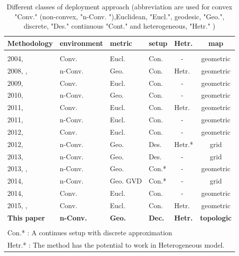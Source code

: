 \documentclass[twocolumn]{svjour3}       %
\begin{document}
\begin{table}[t]
\centering
\caption{Different classes of deployment approach (abbreviation are used for convex "Conv." (non-convex, "n-Conv. "),Euclidean, "Eucl.", geodesic, "Geo.", discrete, "Des." continuous "Cont." and heterogeneous, "Hetr." )   }
\label{tbl:classification}
\begin{tabular}{m{1.8cm}m{1.2cm}m{0.8cm}m{0.55cm}m{0.55cm}c}
Methodology                  	      & environment   & metric     & setup 	& Hetr. & map    \\
 \hline
 \\
 2004, \cite{Cortes2004}      		 & Conv.     	      &  Eucl. & Con.  		&	 ~~- & geometric	\\
 2008, \cite{Pimenta2008},\cite{Pimenta2088SCAT}&n-Conv.&  Geo.  & Con.  		& Hetr.& geometric \\
 2009, \cite{Schwager2009}    		 & Conv.    		  &  Eucl. & Con.		&  ~~- & geometric   \\
 2010, \cite{Breitenmoser2010} 		 & n-Conv.	      &  Geo.  & Con.   	&  ~~- & geometric	\\
 2011, \cite{Stergi2011}    	     & Conv.  	 		  &  Eucl. & Con. 	 	& Hetr.& geometric \\
 2011, \cite{Schwager2011}	   		 & n-Conv. 		  &  Eucl. & Con. 	 	& ~~-    & geometric \\
 2012, \cite{Mahboubi2012}     		 & Conv. 		  &  Eucl. & Con. 		&  ~~-   & geometric \\
 2012, \cite{Durham2012}	  		 & n-Conv. 	      &  Geo.  & Des. 		& Hetr.*& grid\\
 2013, \cite{Yun2013}        		 & n-Conv.		  &  Geo.  & Des. 		&   ~~-  	& grid \\
 2013, \cite{Bhattacharya2013IJRR},\cite{Bhattacharya2013a}		 & n-Conv. 	      &  Geo.  & Con.*    	&  ~~- 	& geometric\\
 2014, \cite{reza2014} 		  		 & n-Conv. 		  & Geo. GVD& Con.*      &  ~~- 	& grid\\
 2014, \cite{Sharifi2014}  	  		 & Conv. 	  	     & Eucl.   & Con.       &  ~~- 	& geometric\\
 2015, \cite{Sharifi2015},\cite{Pierson2015}  	  		 & Conv. 	  	     & Eucl.   & Con.       &  Hetr. & geometric\\
\textbf{This paper}				  		 &\textbf{n-Conv.}	     &\textbf{Geo.}& \textbf{Dec.}       &  \textbf{Hetr.} & \textbf{topologic}\\
 \hline
 \\
 \multicolumn{6}{m{8cm}}{ Con.* : A continues setup with discrete approximation}\\
 \multicolumn{6}{m{8cm}}{ Hetr.* : The method has the potential to work in Heterogeneous model.}
\end{tabular}
\end{table}
%
\end{document}
